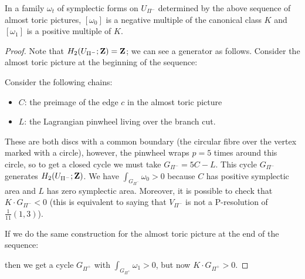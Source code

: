 \documentclass{article}
\begin{document}
\begin{Lemma}
In a family \(\omega_t\) of symplectic forms on \(U_{\Pi^-}\)
determined by the above sequence of almost toric pictures,
\([\omega_0]\) is a negative multiple of the canonical class \(K\)
and \([\omega_1]\) is a positive multiple of \(K\).
\end{Lemma}
\begin{proof}
Note that \(H_2(U_{\Pi^-};\mathbf{Z})=\mathbf{Z}\); we can see a generator as
follows. Consider the almost toric picture at the beginning of the
sequence:
\begin{center}
\end{center}
Consider the following chains:
\begin{itemize}
\item \(C\): the preimage of the edge \(c\) in the
almost toric picture
\item \(L\): the Lagrangian pinwheel living
over the branch cut.
\end{itemize}
These are both discs with a common boundary (the circular fibre over
the vertex marked with a circle), however, the pinwheel wraps
\(p=5\) times around this circle, so to get a closed cycle we must
take \(G_{\Pi^-}=5C-L\). This cycle \(G_{\Pi^-}\) generates
\(H_2(U_{\Pi^-};\mathbf{Z})\). We have \(\int_{G_{\Pi^-}}\omega_0>0\)
because \(C\) has positive symplectic area and \(L\) has zero
symplectic area. Moreover, it is possible to check that \(K\cdot
G_{\Pi^-}<0\) (this is equivalent to saying that \(V_{\Pi^-}\) is
not a P-resolution of \(\frac{1}{11}(1,3)\)).


If we do the same construction for the almost toric picture at the
end of the sequence:
\begin{center}
\end{center}
then we get a cycle \(G_{\Pi^+}\) with
\(\int_{G_{\Pi^+}}\omega_1>0\), but now \(K\cdot G_{\Pi^+}>0\).



\end{proof}
\end{document}
